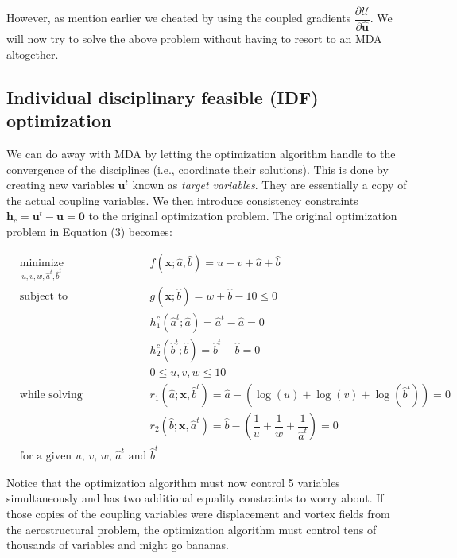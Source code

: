 \documentclass[11pt]{article}
\begin{document}
However, as mention earlier we cheated by using the coupled gradients
\(\dfrac{\partial\mathcal{U}}{\partial\hat{\mathbf{u}}}\). We will now
try to solve the above problem without having to resort to an MDA
altogether.

    \hypertarget{individual-disciplinary-feasible-idf-optimization}{%
\subsection{Individual disciplinary feasible (IDF)
optimization}\label{individual-disciplinary-feasible-idf-optimization}}

We can do away with MDA by letting the optimization algorithm handle to
the convergence of the disciplines (i.e., coordinate their solutions).
This is done by creating new variables \(\mathbf{u}^t\) known as
\emph{target variables}. They are essentially a copy of the actual
coupling variables. We then introduce consistency constraints
\(\mathbf{h}_c = \mathbf{u}^t - \mathbf{u} = \mathbf{0}\) to the
original optimization problem. The original optimization problem in
Equation (3) becomes:

\begin{equation*}
    \begin{aligned}
        & \underset{u,v,w,\hat{a}^t,\hat{b}^t}{\text{minimize}}
        & & f(\mathbf{x};\hat{a},\hat{b}) = u+v+\hat{a}+\hat{b}\\
        & \text{subject to}
        & & g(\mathbf{x};\hat{b}) = w + \hat{b} -10 \leq 0\\
        & & & h_1^c(\hat{a}^t;\hat{a}) = \hat{a}^t - \hat{a} = 0\\
        & & & h_2^c(\hat{b}^t;\hat{b}) = \hat{b}^t - \hat{b} = 0\\
        & & & 0 \leq u,v,w \leq 10\\
        & \text{while solving}
        & & r_1(\hat{a};\mathbf{x},\hat{b}^t) = \hat{a} - \left(\log(u) + \log(v) + \log(\hat{b}^t)\right) = 0\\
        & & & r_2(\hat{b};\mathbf{x},\hat{a}^t) = \hat{b} - \left(\dfrac{1}{u} + \dfrac{1}{w} + \dfrac{1}{\hat{a}^t}\right) = 0\\
        & \text{for a given $u$, $v$, $w$, $\hat{a}^t$ and $\hat{b}^t$}
    \end{aligned}
    \tag{6}
\end{equation*}

Notice that the optimization algorithm must now control 5 variables
simultaneously and has two additional equality constraints to worry
about. If those copies of the coupling variables were displacement and
vortex fields from the aerostructural problem, the optimization
algorithm must control tens of thousands of variables and might go
bananas.
\end{document}

